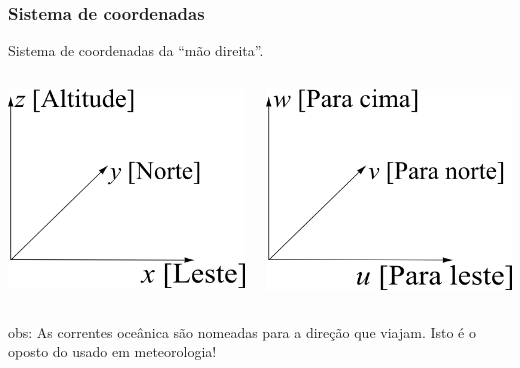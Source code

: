 \begin{frame}
\frametitle{Sistema de coordenadas}
  \begin{block}{}
    Sistema de coordenadas da ``mão direita''.
  \end{block}

  \vspace{0.3cm}

  \begin{columns}
    \begin{column}{0.5\textwidth}
      \includegraphics[scale=0.4]{./figures/coordinates_space.png}
    \end{column}

    \begin{column}{0.5\textwidth}
      \includegraphics[scale=0.4]{./figures/coordinates_velocity.png}
    \end{column}
  \end{columns}

  \vspace{0.5cm} \pause

  \scriptsize{obs: As correntes oceânica são nomeadas para a direção que
              viajam.  Isto é o oposto do usado em meteorologia!}
\end{frame}



